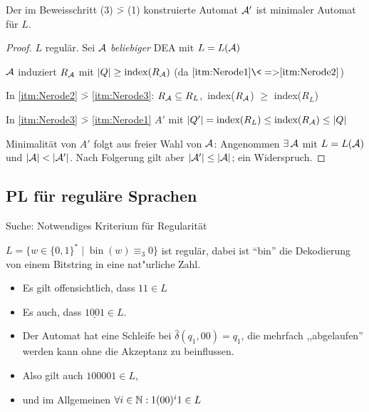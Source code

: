 %
\setcounter{Korollar}{4}
\begin{Korollar}
	Der im Beweisschritt (3) \=> (1) konstruierte Automat $\mathcal{A}'$ ist minimaler Automat für $L$.
\end{Korollar}
\begin{proof}
	$L$ regulär. Sei $\mathcal{A}$ \emph{beliebiger} \ac{DEA} mit $L=L(\mathcal{A})$

	$\mathcal{A}$ induziert $R_{\mathcal{A}}$ mit $|Q|\geq\text{index}(R_{\mathcal{A}})$ (da $\ref{itm:Nerode1} {\<=>} \ref{itm:Nerode2}$)

	In \ref{itm:Nerode2} \=> \ref{itm:Nerode3}: $R_{\mathcal{A}}\subseteq R_L$,\ index($R_{\mathcal{A}}$) $\geq$ index($R_L$)

	In \ref{itm:Nerode3} \=> \ref{itm:Nerode1} $A'$ mit $|Q'|=\text{index}(R_L) \leq \text{index}(R_{\mathcal{A}})\leq |Q|$
	
	Minimalität von $A'$ folgt aus freier Wahl von $\mathcal{A}$: 
  Angenommen $\exists\,\mathcal{A}$ mit $L=L(\mathcal{A})$ und $|\A|<|\A'|$.
  Nach Folgerung gilt aber $|\mathcal{A}'| \leq |\mathcal{A}|$; ein Widerspruch.
\end{proof}

\subsection{\acf{PL} für reguläre Sprachen} %
Suche: Notwendiges Kriterium für Regularität
\begin{Bsp*}
		$L = \{ w\in \{0,1\}^* \mid \operatorname{bin}(w)\equiv_3 0\}$ ist regulär, dabei ist "`bin"' die Dekodierung von einem Bitstring in eine nat"urliche Zahl.
    \begin{center}
  \end{center}
  \begin{itemize}
  \item Es gilt offensichtlich, dass $11 \in L$
  \item Es auch, dass $1 \underline{0 0} 1 \in L$.
  \item Der Automat hat eine Schleife bei $\hat\delta({q_1,00}) = q_1$, die mehrfach ,,abgelaufen'' werden kann ohne die Akzeptanz zu beinflussen.
  \item Also gilt auch $100001 \in L$,
  \item und im Allgemeinen $\forall i\in\mathbb{N}: 1(00)^i1 \in L$
  \end{itemize}
\end{Bsp*}

